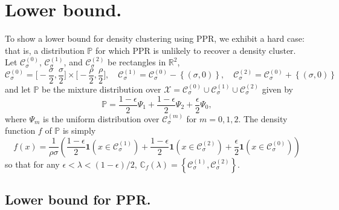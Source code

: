 \documentclass[11pt,twoside]{article}
\newcommand{\set}[1]{\left\{#1\right\}}
\newcommand{\Reals}{\mathbb{R}}
\newcommand{\1}{\mathbf{1}}
\newcommand{\Pbb}{\mathbb{P}}
\newcommand{\Cset}{\mathcal{C}}
\newcommand{\Csig}{\Cset_{\sigma}}
\begin{document}
\section{Lower bound.}
\label{sec:lower_bound}

To show a lower bound for density clustering using PPR, we exhibit a hard case: that is, a distribution $\Pbb$ for which PPR is unlikely to recover a density cluster. Let $\mathcal{C}_{\sigma}^{(0)}$, $\mathcal{C}_{\sigma}^{(1)}$, and $\mathcal{C}_{\sigma}^{(2)}$ be rectangles in $\Reals^2$, 
\begin{equation*}
\mathcal{C}_{\sigma}^{(0)} = \biggl[-\frac{\sigma}{2}, \frac{\sigma}{2}\biggr] \times \biggl[-\frac{\rho}{2}, \frac{\rho}{2}\biggr], \quad \mathcal{C}_{\sigma}^{(1)} = \mathcal{C}_{\sigma}^{(0)} - \set{(\sigma,0)}, \quad \mathcal{C}_{\sigma}^{(2)} = \mathcal{C}_{\sigma}^{(0)} + \set{(\sigma,0)} \tag{$0 < \sigma < \rho$}
\end{equation*}
and let $\mathbb{P}$ be the mixture distribution over $\mathcal{X} = \mathcal{C}_{\sigma}^{(0)} \cup \mathcal{C}_{\sigma}^{(1)} \cup \mathcal{C}_{\sigma}^{(2)}$ given by
\begin{equation*}
\mathbb{P} = \frac{1 - \epsilon}{2} \Psi_1 + \frac{1 - \epsilon}{2} \Psi_2 + \frac{\epsilon}{2} \Psi_0,
\end{equation*}
where $\Psi_m$ is the uniform distribution over $\Csig^{(m)}$ for $m = 0,1,2$. 
The density function $f$ of $\Pbb$ is simply
\begin{equation}
\label{eqn:lb_density}
f(x) = \frac{1}{\rho\sigma}\left(\frac{1 - \epsilon}{2}\1(x \in \mathcal{C}_{\sigma}^{(1)}) + \frac{1 - \epsilon}{2}\1(x \in \mathcal{C}_{\sigma}^{(2)}) + \frac{\epsilon}{2}\1(x \in \mathcal{C}_{\sigma}^{(0)})  \right)
\end{equation}
so that for any $\epsilon < \lambda < (1 - \epsilon)/2$, $\mathbb{C}_{f}(\lambda) = \set{\mathcal{C}_{\sigma}^{(1)}, \mathcal{C}_{\sigma}^{(2)}}$. 

\subsection{Lower bound for PPR.}
\end{document}
